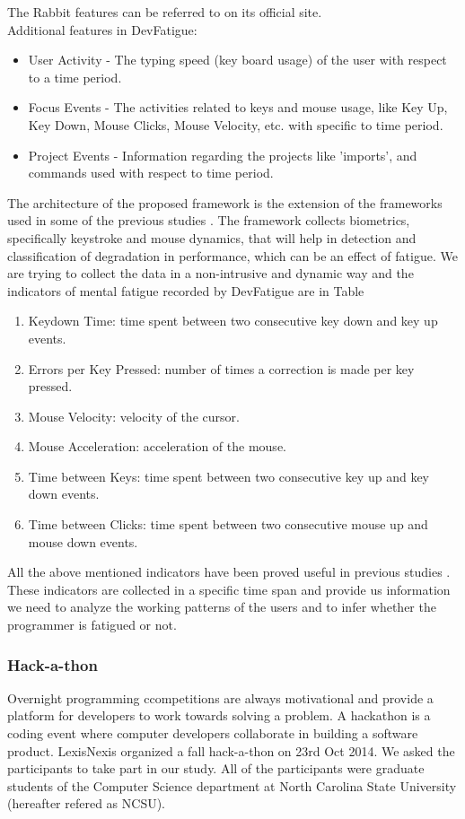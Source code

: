 \documentclass{acm_proc_article-sp}
\begin{document}
The Rabbit features can be referred to on its official
site\footnotemark[\ref{rabbitNote}].\\
Additional features in DevFatigue:
\begin{itemize}
	\item User Activity - The typing speed (key board usage) of the user with
	respect to a time period.
	\item Focus Events - The activities related to keys and mouse usage, like Key
	Up, Key Down, Mouse Clicks, Mouse Velocity, etc. with specific to time period.
	\item Project Events - Information regarding the projects like 'imports', and
	commands used with respect to time period.
\end{itemize}
The architecture of the proposed framework is the extension of the frameworks
used in some of the previous studies \cite{pimenta:analysis}. The framework
collects biometrics, specifically keystroke and mouse dynamics, that will
help in detection and classification of degradation in performance, which can
be an effect of fatigue. We are trying to collect the data in a non-intrusive
and dynamic way and the indicators of mental fatigue recorded by DevFatigue are
in Table 
  	\begin{enumerate}
   		\item Keydown Time: time spent between two consecutive key down and key up
   		events.
   		\item Errors per Key Pressed: number of times a correction is made per key
   		pressed.
   		\item Mouse Velocity: velocity of the cursor.
   		\item Mouse Acceleration: acceleration of the mouse.
   		\item Time between Keys: time spent between two consecutive key up and key
   		down events.
   		\item Time between Clicks: time spent between two consecutive mouse up and
   		mouse down events.
    \end{enumerate}
All the above mentioned indicators have been proved useful in previous studies
\cite{pimenta:monitor} \cite{pimenta:analysis}. These indicators are
collected in a specific time span and provide us information we need to analyze
the working patterns of the users and to infer whether the programmer is
fatigued or not.

\subsubsection{Hack-a-thon}
Overnight programming ccompetitions are always motivational and provide a
platform for developers to work towards solving a problem. A hackathon is a
coding event where computer developers collaborate in building a software
product. LexisNexis organized a fall hack-a-thon on 23rd Oct 2014. We asked the
participants to take part in our study. All of the participants were graduate
students of the Computer Science department at North Carolina State University
(hereafter refered as NCSU).
\end{document}
